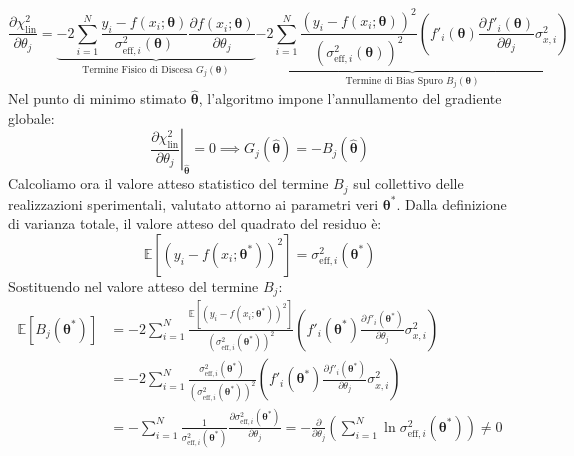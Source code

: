 \documentclass[11pt,a4paper]{article}
\begin{document}
\begin{equation}
    \frac{\partial \chi^2_{\text{lin}}}{\partial \theta_j} = \underbrace{- 2 \sum_{i=1}^N \frac{y_i - f(x_i; \boldsymbol{\theta})}{\sigma_{\text{eff}, i}^2(\boldsymbol{\theta})} \frac{\partial f(x_i; \boldsymbol{\theta})}{\partial \theta_j}}_{\text{Termine Fisico di Discesa } G_j(\boldsymbol{\theta})} \underbrace{- 2 \sum_{i=1}^N \frac{(y_i - f(x_i; \boldsymbol{\theta}))^2}{\left(\sigma_{\text{eff}, i}^2(\boldsymbol{\theta})\right)^2} \left( f'_i(\boldsymbol{\theta}) \frac{\partial f'_i(\boldsymbol{\theta})}{\partial \theta_j} \sigma_{x, i}^2 \right)}_{\text{Termine di Bias Spuro } B_j(\boldsymbol{\theta})}
    \label{eq:gradient_bias}
\end{equation}
Nel punto di minimo stimato $\hat{\boldsymbol{\theta}}$, l'algoritmo impone l'annullamento del gradiente globale:
\begin{equation}
    \left.\frac{\partial \chi^2_{\text{lin}}}{\partial \theta_j}\right|_{\hat{\boldsymbol{\theta}}} = 0 \implies G_j(\hat{\boldsymbol{\theta}}) = - B_j(\hat{\boldsymbol{\theta}})
\end{equation}
Calcoliamo ora il valore atteso statistico del termine $B_j$ sul collettivo delle realizzazioni sperimentali, valutato attorno ai parametri veri $\boldsymbol{\theta}^*$. 
Dalla definizione di varianza totale, il valore atteso del quadrato del residuo è:
\begin{equation}
    \mathbb{E}\left[ (y_i - f(x_i; \boldsymbol{\theta}^*))^2 \right] = \sigma_{\text{eff}, i}^2(\boldsymbol{\theta}^*)
\end{equation}
Sostituendo nel valore atteso del termine $B_j$:
\begin{align}
    \mathbb{E}\left[ B_j(\boldsymbol{\theta}^*) \right] &= - 2 \sum_{i=1}^N \frac{\mathbb{E}\left[ (y_i - f(x_i; \boldsymbol{\theta}^*))^2 \right]}{\left(\sigma_{\text{eff}, i}^2(\boldsymbol{\theta}^*)\right)^2} \left( f'_i(\boldsymbol{\theta}^*) \frac{\partial f'_i(\boldsymbol{\theta}^*)}{\partial \theta_j} \sigma_{x, i}^2 \right) \nonumber \\
    &= - 2 \sum_{i=1}^N \frac{\sigma_{\text{eff}, i}^2(\boldsymbol{\theta}^*)}{\left(\sigma_{\text{eff}, i}^2(\boldsymbol{\theta}^*)\right)^2} \left( f'_i(\boldsymbol{\theta}^*) \frac{\partial f'_i(\boldsymbol{\theta}^*)}{\partial \theta_j} \sigma_{x, i}^2 \right) \nonumber \\
    &= - \sum_{i=1}^N \frac{1}{\sigma_{\text{eff}, i}^2(\boldsymbol{\theta}^*)} \frac{\partial \sigma_{\text{eff}, i}^2(\boldsymbol{\theta}^*)}{\partial \theta_j} = - \frac{\partial}{\partial \theta_j} \left( \sum_{i=1}^N \ln \sigma_{\text{eff}, i}^2(\boldsymbol{\theta}^*) \right) \neq 0
\end{align}
\end{document}
